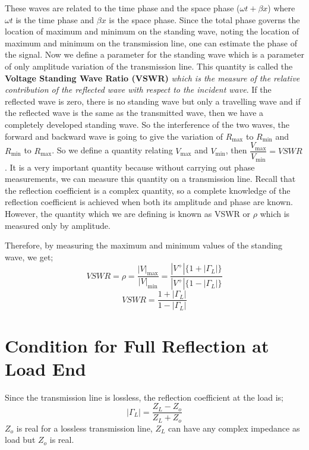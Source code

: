 These waves are related to the time phase and the space phase ($\omega t + \beta x$) where $\omega t$ is the time phase and $\beta x$ is the space phase. Since the total phase governs the location of maximum and minimum on the standing wave, noting the location of maximum and minimum on the transmission line, one can estimate the phase of the signal. Now we define a parameter for the standing wave which is a parameter of only amplitude variation of the transmission line. This quantity is called the \textbf{Voltage Standing Wave Ratio (VSWR)} \emph{which is the measure of the relative contribution of the reflected wave with respect to the incident wave}. If the reflected wave is zero, there is no standing wave but only a travelling wave and if the reflected wave is the same as the transmitted wave, then we have a completely developed standing wave. So the interference of the two waves, the forward and backward wave is going to give the variation of $R_{\max}$ to $R_{\min}$ and $R_{\min}$ to $R_{\max}$. So we define a quantity relating $V_{\max}$ and $V_{\min}$, then $\dfrac{V_{\max}}{V_{\min}}= VSWR$. It is a very important quantity because without carrying out phase measurements, we can measure this quantity on a transmission line. Recall that the reflection coefficient is a complex quantity, so a complete knowledge of the reflection coefficient is achieved when both its amplitude and phase are known. However, the quantity which we are defining is known as VSWR or \(\rho\) which is measured only by amplitude.

Therefore, by measuring the maximum and minimum values of the standing wave, we get;
\begin{dmath*}
VSWR = \rho =\frac{|V|_{\max}}{|V|_{\min}} = \frac{|V^+|\{1+|\Gamma_L|\}}{|V^+|\{1-|\Gamma_L|\}}
\end{dmath*}
\begin{equation}
VSWR  = \frac{1+|\Gamma_L|}{1-|\Gamma_L|}	
\end{equation}

\section{Condition for Full Reflection at Load End}
Since the transmission line is lossless, the reflection coefficient at the load is;
\begin{equation*}
|\Gamma_L| = \frac{Z_L-Z_o}{Z_L+Z_o}
\end{equation*}
$Z_o$ is real for a lossless transmission line, $Z_L$ can have any complex impedance as load but $Z_o$ is real.

